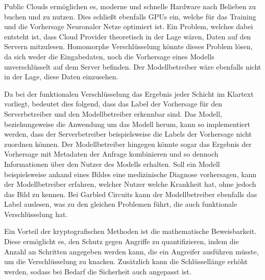 Public Clouds ermöglichen es, moderne und schnelle Hardware nach Belieben zu buchen und zu nutzen.
Dies schließt ebenfalls GPUs ein, welche für das Training und die Vorhersage Neuronaler Netze optimiert ist.
Ein Problem, welches dabei entsteht ist, dass Cloud Provider theoretisch in der Lage wären, Daten auf den Servern mitzulesen.
Homomorphe Verschlüsselung könnte dieses Problem lösen, da sich weder die Eingabedaten, noch die Vorhersage eines Modells unverschlüsselt auf dem Server befinden.
Der Modellbetreiber wäre ebenfalls nicht in der Lage, diese Daten einzusehen.

Da bei der funktionalen Verschlüsselung das Ergebnis jeder Schicht im Klartext vorliegt, bedeutet dies folgend, dass das Label der Vorhersage für den Serverbetreiber und den Modellbetreiber erkennbar sind.
Das Modell, beziehungsweise die Anwendung um das Modell herum, kann so implementiert werden, dass der Serverbetreiber beispielsweise die Labels der Vorhersage nicht zuordnen können.
Der Modellbetreiber hingegen könnte sogar das Ergebnis der Vorhersage mit Metadaten der Anfrage kombinieren und so dennoch Informationen über den Nutzer des Modells erhalten. 
Soll ein Modell beispielsweise anhand eines Bildes eine medizinische Diagnose vorhersagen, kann der Modellbetreiber erfahren, welcher Nutzer welche Krankheit hat, ohne jedoch das Bild zu kennen.
Bei Garbled Circuits kann der Modellbetreiber ebenfalls das Label auslesen, was zu den gleichen Problemen führt, die auch funktionale Verschlüsselung hat.

Ein Vorteil der kryptografischen Methoden ist die mathematische Beweisbarkeit.
Diese ermöglicht es, den Schutz gegen Angriffe zu quantifizieren, indem die Anzahl an Schritten angegeben werden kann, die ein Angreifer ausführen müsste, um die Verschlüsselung zu knacken.
Zusätzlich kann die Schlüssellänge erhöht werden, sodass bei Bedarf die Sicherheit auch angepasst ist.